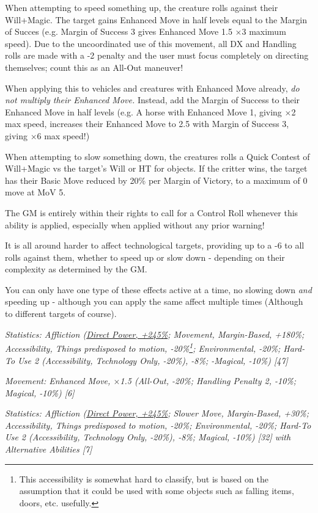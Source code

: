 \begin{multicols*}{3}
	When attempting to speed something up, the creature rolls against their Will+Magic. The target gains Enhanced Move in half levels equal to the Margin of Succes (e.g. Margin of Success 3 gives Enhanced Move 1.5 \(\times\)3 maximum speed). Due to the uncoordinated use of this movement, all DX and Handling rolls are made with a -2 penalty and the user must focus completely on directing themselves; count this as an All-Out maneuver!
	
	When applying this to vehicles and creatures with Enhanced Move already, \textit{do not multiply their Enhanced Move.} Instead, add the Margin of Success to their Enhanced Move in half levels (e.g. A horse with Enhanced Move 1, giving \(\times\)2 max speed, increases their Enhanced Move to 2.5 with Margin of Success 3, giving \(\times\)6 max speed!)
	
	When attempting to slow something down, the creatures rolls a Quick Contest of Will+Magic vs the target's Will or HT for objects. If the critter wins, the target has their Basic Move reduced by 20\% per Margin of Victory, to a maximum of 0 move at MoV 5.
	
	The GM is entirely within their rights to call for a Control Roll whenever this ability is applied, especially when applied without any prior warning!
	
	It is all around harder to affect technological targets, providing up to a -6 to all rolls against them, whether to speed up or slow down - depending on their complexity as determined by the GM.
	
	You can only have one type of these effects active at a time, no slowing down \textit{and} speeding up - although you can apply the same affect multiple times (Although to different targets of course).
	
	\textcolor{OliveGreen}{\textit{Statistics: Affliction (\hyperref[cp_ct]{Direct Power, +245\%}; Movement, Margin-Based, +180\%; Accessibility, Things predisposed to motion, -20\%\footnote{This accessibility is somewhat hard to classify, but is based on the assumption that it could be used with some objects such as falling items, doors, etc. usefully.}; Environmental, -20\%; Hard-To Use 2 (Accessibility, Technology Only, -20\%), -8\%; -Magical, -10\%) [47]}}
	
	\textcolor{OliveGreen}{\textit{Movement: Enhanced Move, \(\times\)1.5 (All-Out, -20\%; Handling Penalty 2, -10\%; Magical, -10\%) [6]}}
	
	\textcolor{OliveGreen}{\textit{Statistics: Affliction (\hyperref[cp_ct]{Direct Power, +245\%}; Slower Move, Margin-Based, +30\%; Accessibility, Things predisposed to motion, -20\%; Environmental, -20\%; Hard-To Use 2 (Accessibility, Technology Only, -20\%), -8\%; Magical, -10\%) [32] with Alternative Abilities [7]}}
	

\end{multicols*}
